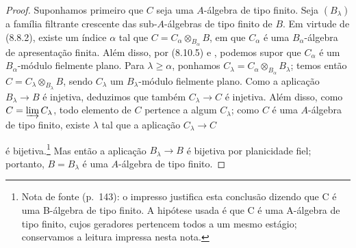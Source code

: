 \begin{proof}
Suponhamos primeiro que $C$ seja
uma $A$-álgebra de tipo finito.
Seja $(B_\lambda)$ a família
filtrante crescente das
sub-$A$-álgebras de tipo finito
de $B$. Em virtude de (8.8.2),
existe um índice $\alpha$ tal que
$C=C_\alpha\otimes_{B_\alpha}B$,
em que $C_\alpha$ é uma
$B_\alpha$-álgebra de apresentação
finita. Além disso, por (8.10.5)
e , podemos supor
que $C_\alpha$ é um $B_\alpha$-módulo
fielmente plano. Para
$\lambda\geq\alpha$, ponhamos
$C_\lambda=C_\alpha\otimes_{B_\alpha}
B_\lambda$; temos então
$C=C_\lambda\otimes_{B_\lambda}B$,
sendo $C_\lambda$ um
$B_\lambda$-módulo fielmente plano.
Como a aplicação $B_\lambda\to B$
é injetiva, deduzimos que também
$C_\lambda\to C$ é injetiva.
Além disso, como
$C=\varinjlim C_\lambda$, todo
elemento de $C$ pertence a algum
$C_\lambda$; como $C$ é uma
$A$-álgebra de tipo finito, existe
$\lambda$ tal que a aplicação
$C_\lambda\to C$


é bijetiva.\footnote{Nota de fonte (p.~143): o impresso justifica esta conclusão dizendo que C é uma B-álgebra de tipo finito. A hipótese usada é que C é uma A-álgebra de tipo finito, cujos geradores pertencem todos a um mesmo estágio; conservamos a leitura impressa nesta nota.} Mas então a aplicação
$B_\lambda\to B$ é bijetiva por
planicidade fiel; portanto,
$B=B_\lambda$ é uma $A$-álgebra
de tipo finito.


\end{proof}
